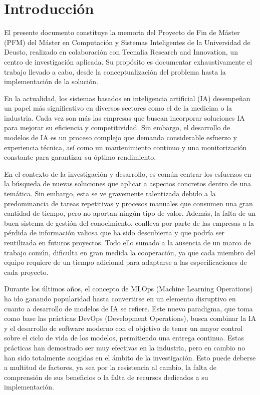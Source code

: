\section{Introducción}
El presente documento constituye la memoria del Proyecto de Fin de Máster (PFM) del Máster 
en Computación y Sistemas Inteligentes de la Universidad de Deusto, realizado en co\-la\-bo\-ra\-ción con 
Tecnalia Research and Innovation, un centro de investigación aplicada. Su propósito es documentar 
exhaustivamente el trabajo llevado a cabo, desde la conceptualización del problema hasta la 
implementación de la solución.\medskip

En la actualidad, los sistemas basados en inteligencia artificial (IA) desempeñan un papel 
más significativo en diversos sectores como el de la medicina o la industria. Cada vez son más las 
empresas que buscan incorporar soluciones IA para mejorar su eficiencia y competitividad. Sin embargo, 
el desarrollo de modelos de IA es un proceso complejo que demanda con\-si\-de\-ra\-ble esfuerzo y experiencia técnica, 
así como un mantenimiento continuo y una monitorización constante para garantizar su óptimo rendimiento.\medskip

En el contexto de la investigación y desarrollo, es común centrar los esfuerzos en la búsqueda de nuevas
soluciones que aplicar a aspectos concretos dentro de una temática. Sin embargo, esta se ve gravemente 
ralentizada debido a la predominancia de tareas repetitivas y procesos manuales que consumen una gran
cantidad de tiempo, pero no aportan ningún tipo de valor. Además, la falta de un buen sistema de gestión
del conocimiento, conlleva por parte de las empresas a la pérdida de información valiosa que ha sido 
descubierta y que podría ser reutilizada en futuros proyectos. Todo ello sumado a la ausencia de un 
marco de trabajo común, dificulta en gran medida la cooperación, ya que cada miembro del equipo requiere 
de un tiempo adicional para adaptarse a las especificaciones de cada proyecto.\medskip

Durante los últimos años, el concepto de MLOps (Machine Learning Operations) ha ido ganando popularidad 
hasta convertirse en un elemento disruptivo en cuanto a desarrollo de modelos de IA se refiere. Este 
nuevo paradigma, que toma como base las prácticas DevOps (Development Operations), busca combinar la IA 
y el desarrollo de software moderno con el objetivo de tener un mayor control sobre el ciclo de 
vida de los modelos, permitiendo una entrega continua. Estas prácticas han demostrado 
ser muy efectivas en la industria, pero en cambio no han sido totalmente acogidas en el ámbito de la 
investigación. Esto puede deberse a multitud de factores, ya sea por la resistencia al cambio, 
la falta de comprensión de sus beneficios o la falta de recursos dedicados a su implementación.\medskip


